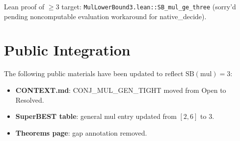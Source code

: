\documentclass[12pt]{article}
\begin{document}
Lean proof of $\geq 3$ target: \texttt{MulLowerBound3.lean::SB\_mul\_ge\_three}
(sorry'd pending noncomputable evaluation workaround for native\_decide).

\section{Public Integration}

The following public materials have been updated to reflect $\mathrm{SB}(\mathrm{mul}) = 3$:
\begin{itemize}
  \item \textbf{CONTEXT.md}: CONJ\_MUL\_GEN\_TIGHT moved from Open to Resolved.
  \item \textbf{SuperBEST table}: general mul entry updated from $[2,6]$ to $3$.
  \item \textbf{Theorems page}: gap annotation removed.
\end{itemize}
\end{document}
